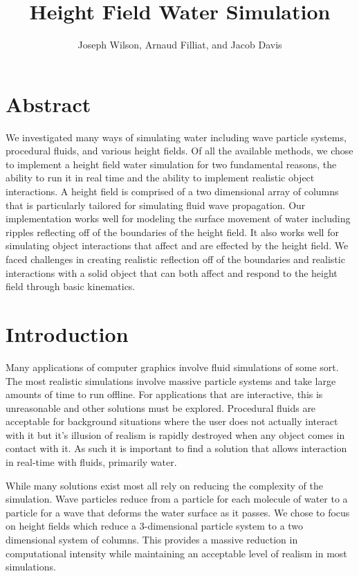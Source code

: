 \documentclass[11pt]{article}
\title{Height Field Water Simulation}
\author{Joseph Wilson, Arnaud Filliat, and Jacob Davis}
\date{\vspace{-5ex}}
\begin{document}
\maketitle

\section{Abstract}

We investigated many ways of simulating water including wave particle systems, 
procedural fluids, and various height fields. Of all the available methods, we 
chose to implement a height field water simulation for two fundamental reasons, 
the ability to run it in real time and the ability to implement realistic 
object interactions. A height field is comprised of a two dimensional array of 
columns that is particularly tailored for simulating fluid wave propagation. 
Our implementation works well for modeling the surface movement of water 
including ripples reflecting off of the boundaries of the height field. It also 
works well for simulating object interactions that affect and are effected by 
the height field. We faced challenges in creating realistic reflection off of 
the boundaries and realistic interactions with a solid object that can both 
affect and respond to the height field through basic kinematics.

\section{Introduction}

Many applications of computer graphics involve fluid simulations of some sort. 
The most realistic simulations involve massive particle systems and take large 
amounts of time to run offline. For applications that are interactive, this is 
unreasonable and other solutions must be explored. Procedural fluids are 
acceptable for background situations where the user does not actually interact 
with it but it’s illusion of realism is rapidly destroyed when any object comes 
in contact with it. As such it is important to find a solution that allows 
interaction in real-time with fluids, primarily water.

While many solutions exist most all rely on reducing the complexity of the 
simulation. Wave particles reduce from a particle for each molecule of water 
to a particle for a wave that deforms the water surface as it passes. We chose 
to focus on height fields which reduce a 3-dimensional particle system to a two 
dimensional system of columns. This provides a massive reduction in 
computational intensity while maintaining an acceptable level of realism in 
most simulations.
\end{document}
